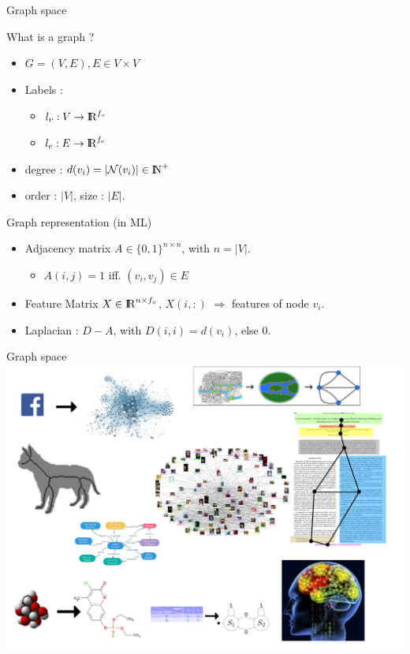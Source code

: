 \documentclass[11pt]{beamer}
\begin{document}
\begin{frame}{Graph space}
  \begin{block}{What is a graph ?}
    \begin{itemize}
    \item $G = (V, E), E \in V \times V$
    \item Labels :
      \begin{itemize}
      \item $l_v : V \to {\mathrm{I\hskip-2.2pt R}}^{f_v}$
      \item $l_e : E \to {\mathrm{I\hskip-2.2pt R}}^{f_e}$
      \end{itemize}
      
    \item degree : $d(v_i) = |\mathcal{N}(v_i)| \in  {\mathrm{I\hskip-2.2pt N}}^+$
    \item order : $|V|$, size : $|E|$.
    \end{itemize}
    
    
  \end{block}
  \begin{block}{Graph representation (in ML)}
    \begin{itemize}
    \item Adjacency matrix $A \in \{0,1\}^{n \times n}$, with $n =
      |V|$.
      \begin{itemize}
      \item $A(i,j) = 1$ iff. $(v_i,v_j) \in E$
      \end{itemize}
    \item Feature Matrix $X \in {\mathrm{I\hskip-2.2pt R}}^{n \times f_v}$, $X(i,:)$ $\Rightarrow$
      features of node $v_i$.
    \item Laplacian : $ D - A$, with $D(i,i) = d(v_i)$, else $0$. 
    
    \end{itemize}
  \end{block}
    
\end{frame}

\begin{frame}{Graph space}
  \includegraphics[width=\textwidth]{graph-examples}
\end{frame}
\end{document}
